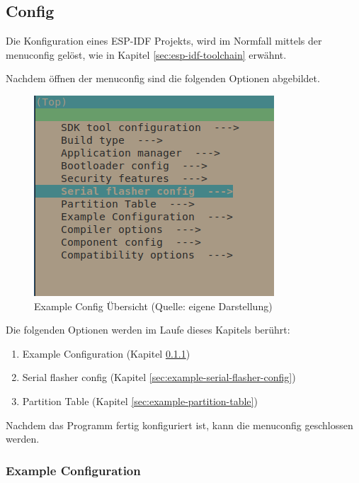 \subsection{Config}

Die Konfiguration eines ESP-IDF Projekts, wird im Normfall mittels der menuconfig gelöst, wie in Kapitel \ref{sec:esp-idf-toolchain} erwähnt.

\pagebreak

Nachdem öffnen der menuconfig sind die folgenden Optionen abgebildet.

\begin{figure}[H]
    \begin{center}
        \includegraphics[scale=1]{images/example_config_overview.png}
        \caption{Example Config Übersicht (Quelle: eigene Darstellung)}
        \label{abb:example_config_overview}
    \end{center}
\end{figure}

Die folgenden Optionen werden im Laufe dieses Kapitels berührt:

\begin{enumerate}
    \item Example Configuration (Kapitel \ref{sec:example-example-config})
    \item Serial flasher config (Kapitel \ref{sec:example-serial-flasher-config})
    \item Partition Table (Kapitel \ref{sec:example-partition-table})
\end{enumerate}

Nachdem das Programm fertig konfiguriert ist, kann die menuconfig geschlossen werden.

\pagebreak

\subsubsection{Example Configuration}\label{sec:example-example-config}

